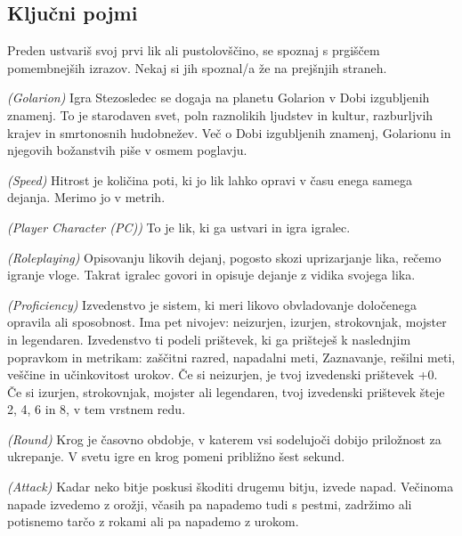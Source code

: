 \subsection{Ključni pojmi}

Preden ustvariš svoj prvi lik ali pustolovščino, se spoznaj s prgiščem pomembnejših izrazov. Nekaj si jih spoznal/a že na prejšnjih straneh.

\newcommand{\rpgterm}[3]{%
    \begin{description}[leftmargin=!, labelwidth=20pt]
        \item[#1] \textit{(#2)} #3
    \end{description}}

\rpgterm{Golarion}{Golarion}{Igra Stezosledec se dogaja na planetu Golarion v Dobi izgubljenih znamenj. To je starodaven svet, poln raznolikih ljudstev in kultur, razburljvih krajev in smrtonosnih hudobnežev. Več o Dobi izgubljenih znamenj, Golarionu in njegovih božanstvih piše v osmem poglavju.}

\rpgterm{Hitrost}{Speed}{Hitrost je količina poti, ki jo lik 
lahko opravi v času enega samega dejanja. Merimo jo v metrih.}

\rpgterm{Igrani lik}{Player Character (PC)}{To je lik, ki ga ustvari in igra igralec.}

\rpgterm{Igranje vlog}{Roleplaying}{Opisovanju likovih dejanj, pogosto skozi uprizarjanje lika, rečemo igranje vloge. Takrat igralec govori in opisuje dejanje z vidika svojega lika.}

\rpgterm{Izvedenstvo}{Proficiency}{Izvedenstvo je sistem, ki meri likovo obvladovanje določenega opravila ali sposobnost. Ima pet nivojev: neizurjen, izurjen, strokovnjak, mojster in legendaren. Izvedenstvo ti podeli prištevek, ki ga prišteješ k naslednjim popravkom in metrikam: zaščitni razred, napadalni meti, Zaznavanje, rešilni meti, veščine in učinkovitost urokov. Če si neizurjen, je tvoj izvedenski prištevek +0. Če si izurjen, strokovnjak, mojster ali legendaren, tvoj izvedenski prištevek šteje 2, 4, 6 in 8, v tem vrstnem redu.}

\rpgterm{Krog}{Round}{Krog je časovno obdobje, v katerem vsi sodelujoči dobijo priložnost za ukrepanje. V svetu igre en krog pomeni približno šest sekund.}

\rpgterm{Napad}{Attack}{Kadar neko bitje poskusi škoditi drugemu bitju, izvede napad. Večinoma napade izvedemo z orožji, včasih pa napademo tudi s pestmi, zadržimo ali potisnemo tarčo z rokami ali pa napademo z urokom.}

